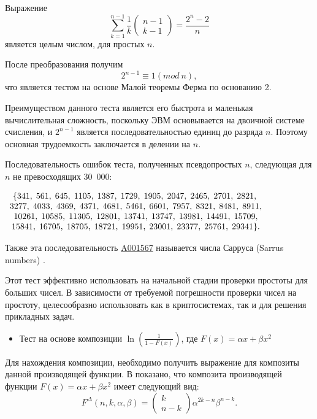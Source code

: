\documentclass[
russian,
cp1251,
14pt,
simple
]{eskdtext}
\theoremstyle{definition}
\begin{document}
Выражение 
\[\sum\limits _{k=1}^{n-1}\frac{1}{k}  \left(\begin{array}{c} {n-1} \\ {k-1} \end{array}\right)=\frac{2^{n} -2}{n} \] 
является целым числом, для простых $n$.

После преобразования получим 
\[2^{n-1} \equiv 1(mod\ n),\] 
что является тестом на основе Малой теоремы Ферма по основанию 2.

Преимуществом данного теста является его быстрота и маленькая вычислительная сложность, поскольку ЭВМ основывается на двоичной системе счисления, и ${2}^{n-1}$ является последовательностью единиц до разряда $n$. Поэтому основная трудоемкость заключается в делении на $n$.

Последовательность ошибок теста, полученных псевдопростых $n$, следующая  для $n$ не превосходящих 30~000:

$
\begin{array}{c} {{\rm \{ 341,\; 561,\; 645,\; 1105,\; 1387,\; 1729,\; 1905,\; 2047,\; 2465,\; 2701,\; 2821,\; }} \\ {{\rm 3277,\; 4033,\; 4369,\; 4371,\; 4681,\; 5461,\; 6601,\; 7957,\; 8321,\; 8481,\; 8911,}} \\ {{\rm \; 10261,\; 10585,\; 11305,\; 12801,\; 13741,\; 13747,\; 13981,\; 14491,\; 15709,\; }} \\ {{\rm 15841,\; 16705,\; 18705,\; 18721,\; 19951,\; 23001,\; 23377,\; 25761,\; 29341\} .}} \end{array} 
$

Также эта последовательность \href{http://oeis.org/A001567}{A001567} называется числа Сарруса (Sarrus numbers) \cite{oeis}.

Этот тест эффективно использовать на начальной стадии проверки простоты для больших чисел.  В зависимости от требуемой погрешности проверки чисел на простоту, целесообразно использовать как в криптосистемах, так и для решения прикладных задач.

\begin{itemize}
\item Тест на основе композиции $\ln (\frac{1}{1-F(x)} )$, где $F(x)=\alpha x+\beta x^{2}$
\end{itemize}

Для нахождения композиции, необходимо получить выражение для композиты данной производящей функции. В \cite{GrKnPa} показано, что композита производящей функции $F(x)=\alpha x+\beta x^{2} $  имеет следующий вид:
$$
F^{\Delta } (n,k,\alpha ,\beta )=\left(\begin{array}{c} {k} \\ {n-k} \end{array}\right)\alpha ^{2k-n} \beta ^{n-k} . 
$$
\end{document}
